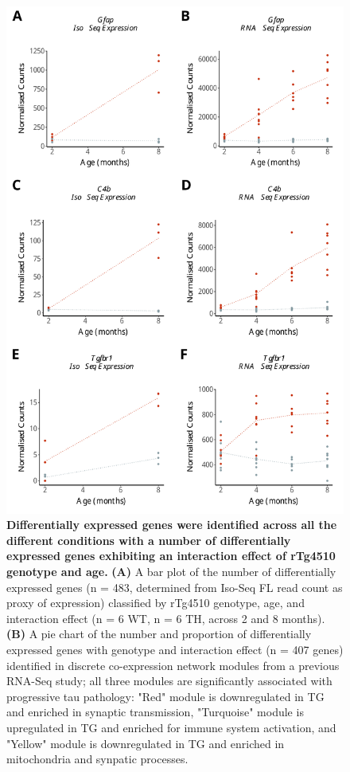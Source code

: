 \begin{figure}[h]
	\centering
	\includegraphics[page=4,trim={0 19cm 0 0},clip,scale = 0.55]{Figures/WholeDifferentialAnalysis.pdf}
	\captionsetup{width=0.95\textwidth}
	\caption[Differentially expressed genes classified by conditions]%
	{\textbf{Differentially expressed genes were identified across all the different conditions with a number of differentially expressed genes exhibiting an interaction effect of rTg4510 genotype and age.} \textbf{(A)} A bar plot of the number of differentially expressed genes (n = 483, determined from Iso-Seq FL read count as proxy of expression) classified by rTg4510 genotype, age, and interaction effect (n = 6 WT, n = 6 TH, across 2 and 8 months). \textbf{(B)} A pie chart of the number and proportion of differentially expressed genes with genotype and interaction effect (n = 407 genes) identified in discrete co-expression network modules from a previous RNA-Seq study\cite{Castanho2020}; all three modules are significantly associated with progressive tau pathology: "Red" module is downregulated in TG and enriched in synaptic transmission, "Turquoise" module is upregulated in TG and enriched for immune system activation, and "Yellow" module is downregulated in TG and enriched in mitochondria and synpatic processes.}    
	\label{fig:dea_model_num}
\end{figure}



